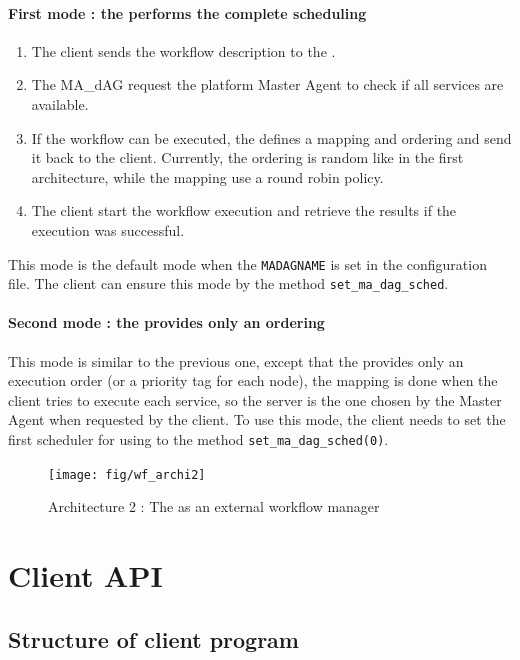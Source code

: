 \paragraph{First mode : the \madag performs the complete scheduling}

\begin{enumerate}
\item The client sends the workflow description to the \madag.
\item The MA\_dAG request the platform Master Agent to check if all
  services are available.
\item If the workflow can be executed, the \madag defines a mapping and
  ordering and send it back to the client. Currently, the ordering is
  random like in the first architecture, while the mapping use a round
  robin policy.
\item The client start the workflow execution and retrieve the results
  if the execution was successful.
\end{enumerate}

This mode is the default mode when the \texttt{MADAGNAME} is set in
the configuration file. The client can ensure this mode by the method
\texttt{set\_ma\_dag\_sched}. 

\paragraph{Second mode : the \madag provides only an ordering}

This mode is similar to the previous one, except that the \madag
provides only an execution order (or a priority tag for each node),
the mapping is done when the client tries to execute each service, so
the server is the one chosen by the Master Agent when requested by the
client. To use this mode, the client needs to set the first scheduler for
\madag using to the method \texttt{set\_ma\_dag\_sched(0)}. 

\begin{figure}[htbp]
  \centering
  \texttt{[image: fig/wf\_archi2]}
  \caption{Architecture 2 : The \madag as an external workflow manager}
  \label{fig:archi2}
\end{figure}




\section{Client API}


\subsection{Structure of client program}
\label{sec:client_prg}

